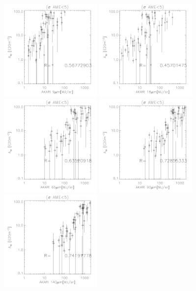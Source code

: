 \begin{figure}[!htb]
\centering
 \includegraphics[width=50mm]{IRIntMWAmp/akari9_Asp_nosp.pdf}
  \includegraphics[width=50mm]{IRIntMWAmp/akari18_Asp_nosp.pdf}
  \includegraphics[width=50mm]{IRIntMWAmp/akari65_Asp_nosp.pdf}
  \includegraphics[width=50mm]{IRIntMWAmp/akari90_Asp_nosp.pdf}
  \includegraphics[width=50mm]{IRIntMWAmp/akari140_Asp_nosp.pdf}

\end{figure}
